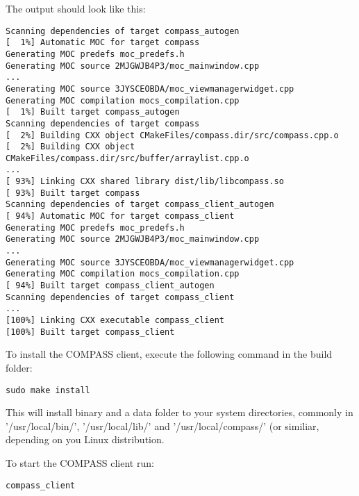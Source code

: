 The output should look like this:

\begin{lstlisting}
Scanning dependencies of target compass_autogen
[  1%] Automatic MOC for target compass
Generating MOC predefs moc_predefs.h
Generating MOC source 2MJGWJB4P3/moc_mainwindow.cpp
...
Generating MOC source 3JYSCEOBDA/moc_viewmanagerwidget.cpp
Generating MOC compilation mocs_compilation.cpp
[  1%] Built target compass_autogen
Scanning dependencies of target compass
[  2%] Building CXX object CMakeFiles/compass.dir/src/compass.cpp.o
[  2%] Building CXX object CMakeFiles/compass.dir/src/buffer/arraylist.cpp.o
...
[ 93%] Linking CXX shared library dist/lib/libcompass.so
[ 93%] Built target compass
Scanning dependencies of target compass_client_autogen
[ 94%] Automatic MOC for target compass_client
Generating MOC predefs moc_predefs.h
Generating MOC source 2MJGWJB4P3/moc_mainwindow.cpp
...
Generating MOC source 3JYSCEOBDA/moc_viewmanagerwidget.cpp
Generating MOC compilation mocs_compilation.cpp
[ 94%] Built target compass_client_autogen
Scanning dependencies of target compass_client
...
[100%] Linking CXX executable compass_client
[100%] Built target compass_client
\end{lstlisting}

To install the COMPASS client, execute the following command in the build folder:

\begin{lstlisting}
sudo make install
\end{lstlisting}

This will install binary and a data folder to your system directories, commonly in '/usr/local/bin/', '/usr/local/lib/' and '/usr/local/compass/' (or similiar, depending on you Linux distribution.

To start the COMPASS client run:
\begin{lstlisting}
compass_client
\end{lstlisting}  
